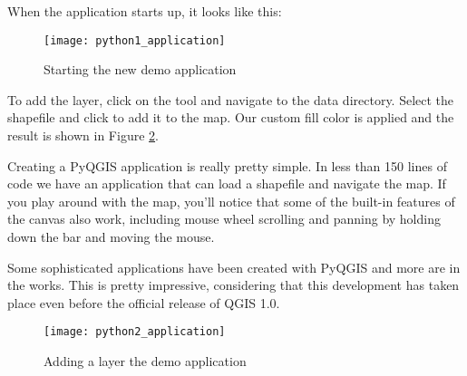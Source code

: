 When the application starts up, it looks like this:

\begin{figure}[ht]
\begin{center}
  \caption{Starting the new demo application \nixcaption} \label{fig:demo_app_startup}
  \texttt{[image: python1\_application]}
\end{center}
\end{figure}

To add the  layer, click on the 
 tool and navigate to the data directory.
Select the shapefile and click  to add it to the map. 
Our custom fill color is applied and the result is shown in Figure \ref{fig:demo_app_done}.

Creating a PyQGIS application is really pretty simple.  In less than 150 lines
of code we have an application that can load a shapefile and navigate the map.
If you play around with the map, you'll notice that some of the built-in
features of the canvas also work, including mouse wheel scrolling and panning
by holding down the  bar and moving the mouse.

Some sophisticated applications have been created with PyQGIS and more are in 
the works. This is pretty impressive, considering that this development has 
taken place even before the official release of QGIS 1.0.

\begin{figure}[ht]
\begin{center}
  \caption{Adding a layer the demo application \nixcaption} \label{fig:demo_app_done}
  \texttt{[image: python2\_application]}
\end{center}
\end{figure}

